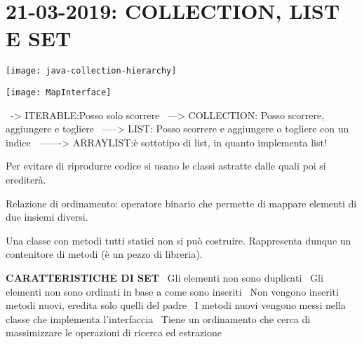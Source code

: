

\newpage
\section{21-03-2019: COLLECTION, LIST E SET}
\begin{center}
\texttt{[image: java-collection-hierarchy]}
\end{center} 

\begin{center}
\texttt{[image: MapInterface]}
\end{center} 
\textbullet\ -> ITERABLE:Posso solo scorrere \newline
\textbullet\ ---> COLLECTION: Posso scorrere, aggiungere e togliere \newline
\textbullet\ -----> LIST: Posso scorrere e aggiungere o togliere con un indice \newline
\textbullet\ -------> ARRAYLIST:è sottotipo di list, in quanto implementa list! \newline
{} \newline

\noindent Per evitare di riprodurre codice si usano le classi astratte dalle quali poi si erediterà. 

\noindent Relazione di ordinamento: operatore binario che permette di mappare elementi di due insiemi diversi.

\noindent Una classe con metodi tutti statici non si può costruire. Rappresenta dunque un contenitore di metodi (è un pezzo di libreria).

\noindent \textbf{CARATTERISTICHE DI SET}\newline
\textbullet\ Gli elementi non sono duplicati \newline
\textbullet\ Gli elementi non sono ordinati in base a come sono inseriti \newline	
\textbullet\ Non vengono inseriti metodi nuovi, eredita solo quelli del padre \newline
\textbullet\ I metodi nuovi vengono messi nella classe che implementa l'interfaccia \newline
\textbullet\ Tiene un ordinamento che cerca di massimizzare le operazioni di ricerca ed estrazione \newline


